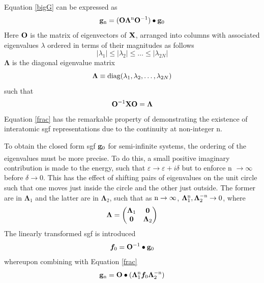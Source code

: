 \documentclass[a4paper, 12pt]{article}
\newcommand{\site}[1]{\textsuperscript{\textcolor{blue}{\cite{#1}}}}
\begin{document}
Equation \eqref{bigG} can be expressed as 
\begin{equation}\label{frac}
	{\bf g}_{\rm n} = ({\bf O}\bm\Lambda^{\rm n}{\bf O}^{-1})\bullet {\bf g}_0
\end{equation}
Here ${\bf O}$ is the matrix of eigenvectors of ${\bf X}$, arranged into columns with associated eigenvalues $\lambda$ ordered in terms of their magnitudes as follows
\begin{equation}
	| {\lambda}_1 | \leq | {\lambda}_2 | \leq \ldots \leq | {\lambda}_{2N} |
\end{equation}
$\bm \Lambda$ is the diagonal eigenvalue matrix
\begin{equation}
	\bm \Lambda \equiv {\rm diag}(\lambda_1,\lambda_2,\dots,\lambda_{2N})
\end{equation}
such that 
	\begin{equation}
		{\bf O}^{-1} {\bf X}{\bf O} = \bm \Lambda
	\end{equation}
	Equation \eqref{frac} has the remarkable property of demonstrating the existence of interatomic \gls{sgf} representations due to the continuity at non-integer n.
	\\\par To obtain the closed form \gls{sgf} ${\bf g}_0$ for semi-infinite systems, the ordering of the eigenvalues must be more precise\site{rev3}. To do this, a small positive imaginary contribution is made to the energy, such that $\varepsilon \longrightarrow \varepsilon+i\delta$ but to enforce n $\rightarrow \infty$ before $\delta \rightarrow 0$. This has the effect of shifting pairs of eigenvalues on the unit circle such that one moves just inside the circle and the other just outside. The former are in $\bm \Lambda_1$ and the latter are in $\bm \Lambda_2$, such that as $\rm n\rightarrow\infty$, \quad $\bm\Lambda_1^{\rm n}, \bm\Lambda_2^{-\rm n}\rightarrow 0$, where
	\begin{equation}
		\bm \Lambda = \begin{pmatrix} \bm \Lambda_1&\bf 0\\\bf 0&\bm \Lambda_2 \end{pmatrix}
	\end{equation}
	The linearly transformed \gls{sgf} is introduced
	\begin{equation}\label{f}
		\bm f_0 = {\bf O}^{-1}\bullet {\bf g}_0
	\end{equation}
	whereupon combining with Equation \eqref{frac}
	\begin{equation}\label{glam}
		{\bf g}_{\rm n} = {\bf O}\bullet(\bm\Lambda_1^{\rm n}\bm f_0\bm\Lambda_2^{-\rm n})
	\end{equation}
\end{document}
